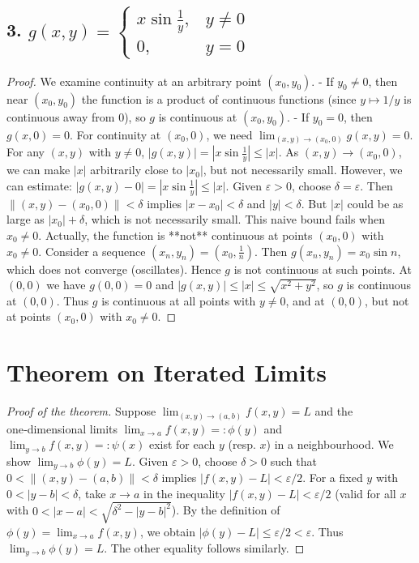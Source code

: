 \documentclass{article}
\begin{document}
\subsection*{3. $g(x,y)=\begin{cases}x\sin\frac1y,&y\neq0\\0,&y=0\end{cases}$}
\begin{proof}
	We examine continuity at an arbitrary point $(x_0,y_0)$.
	- If $y_0\neq0$, then near $(x_0,y_0)$ the function is a product of continuous functions (since $y\mapsto1/y$ is continuous away from $0$), so $g$ is continuous at $(x_0,y_0)$.
	- If $y_0=0$, then $g(x,0)=0$. For continuity at $(x_0,0)$, we need $\lim_{(x,y)\to(x_0,0)}g(x,y)=0$.
	For any $(x,y)$ with $y\neq0$, $|g(x,y)|=|x\sin\frac1y|\le |x|$. As $(x,y)\to(x_0,0)$, we can make $|x|$ arbitrarily close to $|x_0|$, but not necessarily small. However, we can estimate:
	$|g(x,y)-0| = |x\sin\frac1y| \le |x|$. Given $\varepsilon>0$, choose $\delta=\varepsilon$. Then $\|(x,y)-(x_0,0)\|<\delta$ implies $|x-x_0|<\delta$ and $|y|<\delta$. But $|x|$ could be as large as $|x_0|+\delta$, which is not necessarily small. This naive bound fails when $x_0\neq0$.
	Actually, the function is **not** continuous at points $(x_0,0)$ with $x_0\neq0$. Consider a sequence $(x_n,y_n)=(x_0,\frac1n)$. Then $g(x_n,y_n)=x_0\sin n$, which does not converge (oscillates). Hence $g$ is not continuous at such points.
	At $(0,0)$ we have $g(0,0)=0$ and $|g(x,y)|\le|x|\le\sqrt{x^2+y^2}$, so $g$ is continuous at $(0,0)$.
	Thus $g$ is continuous at all points with $y\neq0$, and at $(0,0)$, but not at points $(x_0,0)$ with $x_0\neq0$.
\end{proof}

\section*{Theorem on Iterated Limits}
\begin{proof}[Proof of the theorem]
	Suppose $\lim_{(x,y)\to(a,b)}f(x,y)=L$ and the one‑dimensional limits $\lim_{x\to a}f(x,y)=:\phi(y)$ and $\lim_{y\to b}f(x,y)=:\psi(x)$ exist for each $y$ (resp. $x$) in a neighbourhood.
	We show $\lim_{y\to b}\phi(y)=L$. Given $\varepsilon>0$, choose $\delta>0$ such that $0<\|(x,y)-(a,b)\|<\delta$ implies $|f(x,y)-L|<\varepsilon/2$.
	For a fixed $y$ with $0<|y-b|<\delta$, take $x\to a$ in the inequality $|f(x,y)-L|<\varepsilon/2$ (valid for all $x$ with $0<|x-a|<\sqrt{\delta^2-|y-b|^2}$). By the definition of $\phi(y)=\lim_{x\to a}f(x,y)$, we obtain $|\phi(y)-L|\le\varepsilon/2<\varepsilon$. Thus $\lim_{y\to b}\phi(y)=L$. The other equality follows similarly.
\end{proof}
\end{document}
